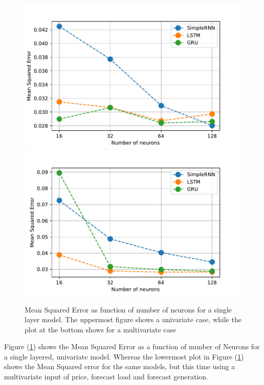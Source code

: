 \documentclass
[twocolumn,
secnumarabic,
nobibnotes,
aps,
prl,
reprint,
groupedaddress,
amsmath,
amssymb,
]{revtex4-2}
\begin{document}
\begin{figure}
  \includegraphics[width=\columnwidth]{figures/small_architecture_grid_search.pdf}
  \includegraphics[width=\columnwidth]{figures/multivariate_forecast_small_architecture_grid_search.pdf}
  \caption{\label{fig_smallgs}Mean Squared Error as function of number of neurons for a single layer model. The uppermost figure shows a univariate case, while the plot at the bottom shows for a multivariate case}
\end{figure}

Figure (\ref{fig_smallgs}) shows the Mean Squared Error as a function of number of Neurons for a single layered, univariate model. Whereas the lowermost plot in Figure (\ref{fig_smallgs}) shows the Mean Squared error for the same models, but this time using a multivariate input of price, forecast load and forecast generation.
\end{document}
